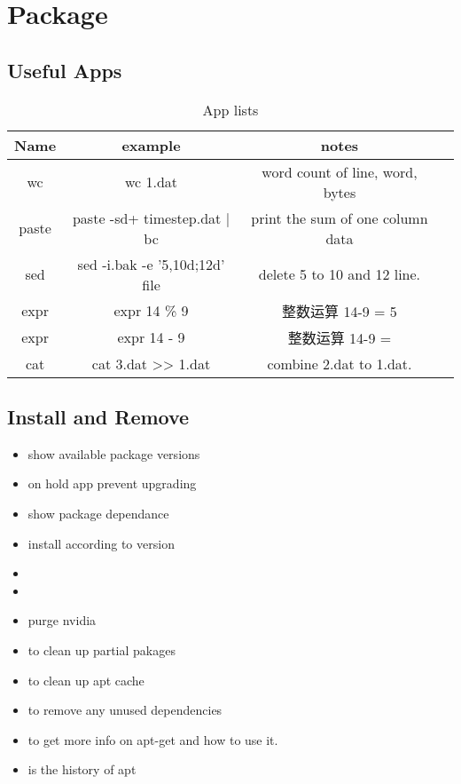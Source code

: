 \chapter{Package}

\section{Useful Apps}
\begin{table}[ht]
\caption{App lists}
\centering
\begin{tabular}{c c c c}
\hline\hline
Name & example & notes \\ [0.5ex]
\hline
wc & {wc 1.dat} & word count of line, word, bytes\\[1ex]
paste & paste -sd+ timestep.dat | bc &  print the sum of one column data\\
sed & {sed -i.bak -e '5,10d;12d' file} & delete 5 to 10 and 12 line.\\
expr & {expr 14 \% 9} & 整数运算 14-9 = 5 \\
expr & {expr 14 - 9} & 整数运算 14-9 =  \\
cat & {cat 3.dat >> 1.dat} & combine 2.dat to 1.dat.\\
\hline
\end{tabular}
\label{tab_apps}
\end{table}

\section{Install and Remove}
\begin{itemize}
\item{} show available package versions
\item{} on hold app prevent upgrading
\item{} show package dependance
\item{} install according to version
\item{}
\item{}
\item{} purge nvidia
\item{} to clean up partial pakages
\item{} to clean up apt cache
\item{} to remove any unused dependencies
\item{} to get more info on apt-get and how to use it.
\item{} is the history of apt
\end{itemize}

